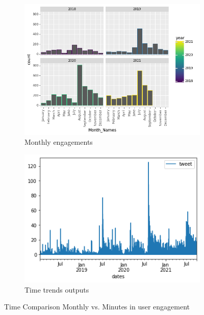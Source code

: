 \begin{figure}
      \centering
	   \begin{subfigure}{0.3\linewidth}
		\includegraphics[width=\linewidth]{postgrad_template 2/chapters/chapter1/Users Month Names.png}
		\caption{Monthly engagements}
		\label{fig: Monthly Breakdown for engagement}
	   \end{subfigure}
	   \begin{subfigure}{0.3\linewidth}
		\includegraphics[width=\linewidth]{postgrad_template 2/chapters/chapter1/User 1 Minute Count.png}
		\caption{Time trends outputs}
		\label{fig:Breakdown of time trends by minute}
	   \end{subfigure}
	   \vfill
	 \caption{Time Comparison Monthly vs. Minutes in user engagement}
\end{figure}

